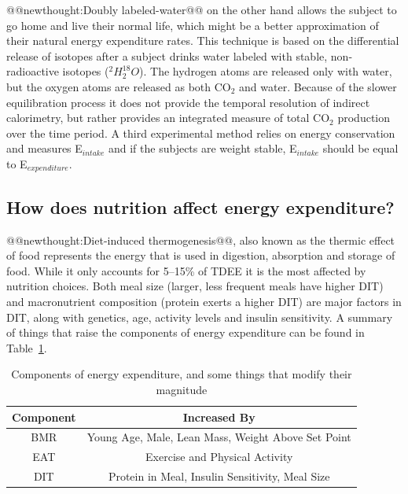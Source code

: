 \documentclass{tufte-handout}
\makeatletter
\def\newthought#1{@@newthought:#1@@}
\makeatother
\begin{document}
\newthought{Doubly labeled-water} on the other hand allows the subject to go home and live their normal life, which might be a better approximation of their natural energy expenditure rates.  This technique is based on the differential release of isotopes after a subject drinks water labeled with stable, non-radioactive isotopes ($^2H_2^{18}O$).  The hydrogen atoms are released only with water, but the oxygen atoms are released as both CO$_2$ and water.  Because of the slower equilibration process it does not provide the temporal resolution of indirect calorimetry, but rather provides an integrated measure of total CO$_2$ production over the time period.  A third experimental method relies on energy conservation and measures E$_{intake}$ and if the subjects are weight stable, E$_{intake}$ should be equal to E$_{expenditure}$. 

\subsection{How does nutrition affect energy expenditure?} 

\newthought{Diet-induced thermogenesis}, also known as the thermic effect of food represents the energy that is used in digestion, absorption and storage of food.  While it only accounts for 5--15\% of TDEE it is the most affected by nutrition choices.  Both meal size (larger, less frequent meals have higher DIT) and macronutrient composition (protein exerts a higher DIT) are major factors in DIT, along with genetics, age, activity levels and insulin sensitivity.  A summary of things that raise the components of energy expenditure can be found in Table~\ref{tab:ee-components}.


\begin{table}
\centering
\caption{Components of energy expenditure, and some things that modify their magnitude}\label{tab:ee-components}
\begin{tabular}{cc}
\hline
\textbf{Component} & \textbf{Increased By}  \\
\hline
BMR & Young Age, Male, Lean Mass, Weight Above Set Point\\
EAT & Exercise and Physical Activity\\
DIT & Protein in Meal, Insulin Sensitivity, Meal Size\\
\hline
\end{tabular}
\end{table}
\end{document}
